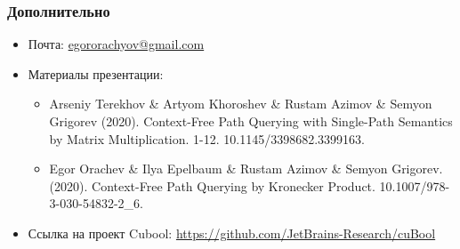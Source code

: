 \documentclass[xcolor=table,english]{beamer}
\begin{document}


\begin{frame} \frametitle{Дополнительно}
    \begin{itemize}
        \item Почта: \href{mailto:egororachyov@gmail.com}{egororachyov@gmail.com}
        \item Материалы презентации:
        {
            \begin{itemize}
                \item Arseniy Terekhov \& Artyom Khoroshev \& Rustam Azimov \& Semyon Grigorev (2020). Context-Free Path Querying with Single-Path Semantics by Matrix Multiplication. 1-12. 10.1145/3398682.3399163. 
                \item Egor Orachev \& Ilya Epelbaum \& Rustam Azimov \& Semyon Grigorev. (2020). Context-Free Path Querying by Kronecker Product. 10.1007/978-3-030-54832-2\_6. 
            \end{itemize}
        }
        \item Ссылка на проект Cubool: \href{https://github.com/JetBrains-Research/cuBool}{https://github.com/JetBrains-Research/cuBool}
    \end{itemize}
\end{frame}
\end{document}
